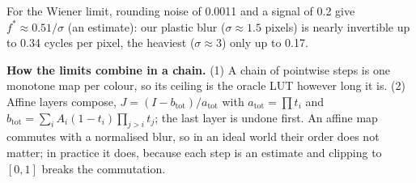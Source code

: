 \documentclass[10pt,a4paper]{article}
\begin{document}
For the Wiener limit, rounding noise of 0.0011 and a signal of 0.2 give $f^*\approx0.51/\sigma$ (an estimate): our plastic blur ($\sigma\approx1.5$ pixels) is nearly invertible up to 0.34 cycles per pixel, the heaviest ($\sigma\approx3$) only up to 0.17.

\textbf{How the limits combine in a chain.} (1) A chain of pointwise steps is one monotone map per colour, so its ceiling is the oracle LUT however long it is. (2) Affine layers compose, $J=(I-b_{\mathrm{tot}})/a_{\mathrm{tot}}$ with $a_{\mathrm{tot}}=\prod t_i$ and $b_{\mathrm{tot}}=\sum_iA_i(1-t_i)\prod_{j>i}t_j$; the last layer is undone first. An affine map commutes with a normalised blur, so in an ideal world their order does not matter; in practice it does, because each step is an estimate and clipping to $[0,1]$ breaks the commutation.
\end{document}

